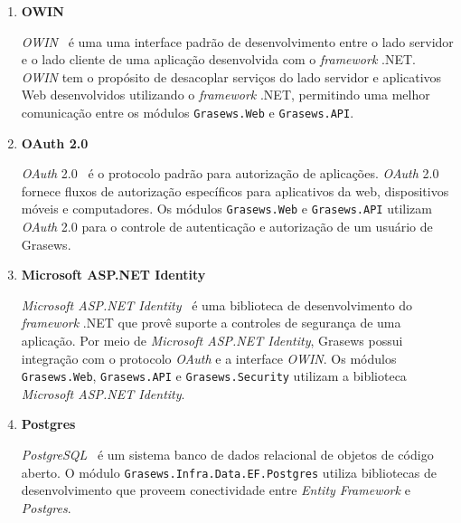 \begin{enumerate}
  
  \item \textbf{OWIN}
  
  \textit{OWIN}~\cite{OWIN-2019} é uma uma interface padrão de desenvolvimento entre o lado servidor e o lado cliente de uma aplicação desenvolvida com o \textit{framework} .NET. \textit{OWIN} tem o propósito de desacoplar serviços do lado servidor e aplicativos Web desenvolvidos utilizando o \textit{framework} .NET, permitindo uma melhor comunicação entre os módulos \texttt{Grasews.Web} e \texttt{Grasews.API}.
  
  
  \item \textbf{OAuth 2.0}
  
  \textit{OAuth} 2.0~\cite{OAUTH-2019} é o protocolo padrão para autorização de aplicações. \textit{OAuth} 2.0 fornece fluxos de autorização específicos para aplicativos da web, dispositivos móveis e computadores. Os módulos \texttt{Grasews.Web} e \texttt{Grasews.API} utilizam \textit{OAuth} 2.0 para o controle de autenticação e autorização de um usuário de Grasews.
  
  
  \newpage
  
  \item \textbf{Microsoft ASP.NET Identity}
  
  \textit{Microsoft ASP.NET Identity}~\cite{MICROSOFT-2019-IDENTITY} é uma biblioteca de desenvolvimento do \textit{framework} .NET que provê suporte a controles de segurança de uma aplicação. Por meio de \textit{Microsoft ASP.NET Identity}, Grasews possui integração com o protocolo \textit{OAuth} e a interface \textit{OWIN}. Os módulos \texttt{Grasews.Web}, \texttt{Grasews.API} e \texttt{Grasews.Security} utilizam a biblioteca \textit{Microsoft ASP.NET Identity}.
  
  
  \item \textbf{Postgres}
  
  \textit{PostgreSQL}~\cite{POSTGRES-2019} é um sistema banco de dados relacional de objetos de código aberto. O módulo \texttt{Grasews.Infra.Data.EF.Postgres} utiliza bibliotecas de desenvolvimento que proveem conectividade entre \textit{Entity Framework} e \textit{Postgres}.
  

\end{enumerate}
